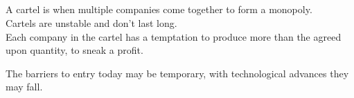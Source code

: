 \subsection{}
A cartel is when multiple companies come together to form a monopoly.\\
Cartels are unstable and don't last long.\\
Each company in the cartel has a temptation to produce more than the agreed upon quantity, to sneak a profit.\\
\par
The barriers to entry today may be temporary, with technological advances they may fall.